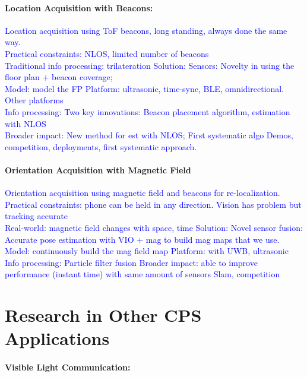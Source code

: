 \documentclass[10pt]{article}
\begin{document}
\paragraph{Location Acquisition with Beacons: }
\textcolor{blue}{
Location acquisition using ToF beacons, long standing, always done the same way.\\
Practical constraints: NLOS, limited number of beacons\\
Traditional info processing: trilateration 
Solution:
Sensors: Novelty in using the floor plan + beacon coverage;\\
Model: model the FP
Platform: ultrasonic, time-sync, BLE, omnidirectional. Other platforms\\
Info processing: Two key innovations: Beacon placement algorithm, estimation with NLOS\\
Broader impact:
New method for est with NLOS;
First systematic algo 
Demos, competition, deployments, first systematic approach.
}
\paragraph{Orientation Acquisition with Magnetic Field}
\textcolor{blue}{
Orientation acquisition using magnetic field and beacons for re-localization.\\
Practical constraints: phone can be held in any direction. Vision has problem but tracking accurate\\
Real-world: magnetic field changes with space, time
Solution:
Novel sensor fusion: Accurate pose estimation with VIO + mag to build mag maps that we use.\\
Model: continuously build the mag field map
Platform: with UWB, ultrasonic
Info processing: 
Particle filter fusion
Broader impact: 
able to improve performance (instant time) with same amount of sensors
Slam, competition
}

\section{Research in Other CPS Applications}
\paragraph{Visible Light Communication: }
\end{document}

